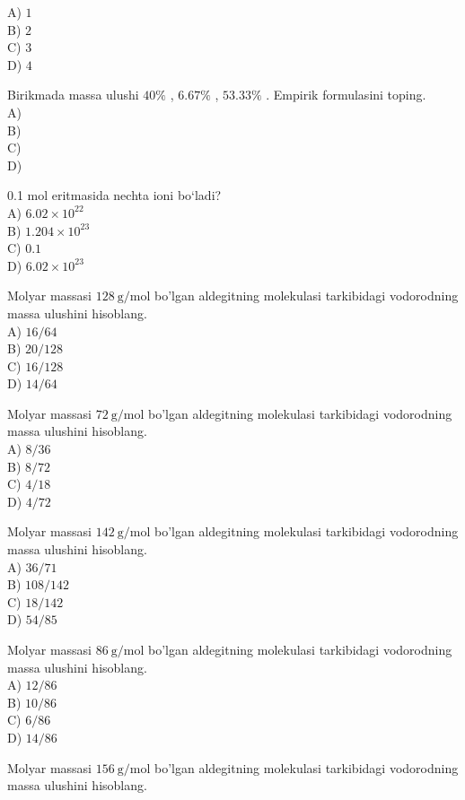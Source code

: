 A) $1$\\
B) $2$\\
C) $3$\\
D) $4$
\item Birikmada massa ulushi $40\%$ , $6.67\%$ , $53.33\%$ . Empirik formulasini toping.\\
A) \\
B) \\
C) \\
D) 
\item 0.1 mol  eritmasida nechta  ioni bo‘ladi?\\
A) $6.02 \times 10^{22}$\\
B) $1.204 \times 10^{23}$\\
C) $0.1$\\
D) $6.02 \times 10^{23}$
  \item Molyar massasi $128 \mathrm{~g} / \mathrm{mol}$ bo'lgan aldegitning molekulasi tarkibidagi vodorodning massa ulushini hisoblang.\\
A) $16 / 64$\\
B) $20 / 128$\\
C) $16 / 128$\\
D) $14 / 64$
  \item Molyar massasi $72 \mathrm{~g} / \mathrm{mol}$ bo'lgan aldegitning molekulasi tarkibidagi vodorodning massa ulushini hisoblang.\\
A) $8 / 36$\\
B) $8 / 72$\\
C) $4 / 18$\\
D) $4 / 72$
  \item Molyar massasi $142 \mathrm{~g} / \mathrm{mol}$ bo'lgan aldegitning molekulasi tarkibidagi vodorodning massa ulushini hisoblang.\\
A) $36 / 71$\\
B) $108 / 142$\\
C) $18 / 142$\\
D) $54 / 85$
  \item Molyar massasi $86 \mathrm{~g} / \mathrm{mol}$ bo'lgan aldegitning molekulasi tarkibidagi vodorodning massa ulushini hisoblang.\\
A) $12 / 86$\\
B) $10 / 86$\\
C) $6 / 86$\\
D) $14 / 86$
  \item Molyar massasi $156 \mathrm{~g} / \mathrm{mol}$ bo'lgan aldegitning molekulasi tarkibidagi vodorodning massa ulushini hisoblang.\\
